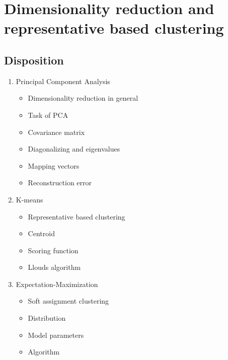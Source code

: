 \documentclass[a4, english]{article}
\begin{document}
\newpage

\section{Dimensionality reduction and representative based clustering}
\subsection{Disposition}
\begin{enumerate}
	\item Principal Component Analysis
  \begin{itemize}
  	\item Dimensionality reduction in general
    \item Task of PCA
    \item Covariance matrix
    \item Diagonalizing and eigenvalues
    \item Mapping vectors
    \item Reconstruction error
  \end{itemize}
  \item K-means
  \begin{itemize}
  	\item Representative based clustering
    \item Centroid
    \item Scoring function
    \item Llouds algorithm
  \end{itemize}
  \item Expectation-Maximization 
  \begin{itemize}
  	\item Soft assignment clustering
    \item Distribution
    \item Model parameters
    \item Algorithm
  \end{itemize}
\end{enumerate}
\newpage
\end{document}
